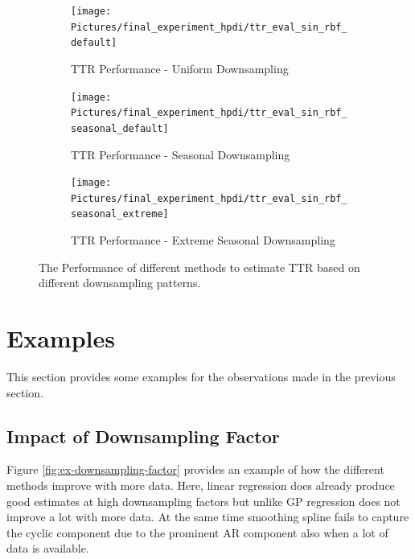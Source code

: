 \begin{figure}[!htb]
\centering
\begin{subfigure}{\textwidth}
    \centering
    \texttt{[image: Pictures/final\_experiment\_hpdi/ttr\_eval\_sin\_rbf\_default]}
    \caption{TTR Performance - Uniform Downsampling}
    \label{fig:ttr-uniform-sampling-performance}
\end{subfigure}

\bigskip

\begin{subfigure}{\textwidth}
    \centering
    \texttt{[image: Pictures/final\_experiment\_hpdi/ttr\_eval\_sin\_rbf\_seasonal\_default]}
    \caption{TTR Performance - Seasonal Downsampling}
    \label{fig:ttr-seasonal-sampling-performance}
\end{subfigure}

\bigskip

\begin{subfigure}{\textwidth}
    \centering
    \texttt{[image: Pictures/final\_experiment\_hpdi/ttr\_eval\_sin\_rbf\_seasonal\_extreme]}
    \caption{TTR Performance - Extreme Seasonal Downsampling}
    \label{fig:ttr-extreme-seasonal-sampling-performance}
\end{subfigure}

\caption[TTR Performance]{The Performance of different methods to
estimate TTR based on different downsampling patterns.
}
\label{fig:ttr-performance}
\end{figure}


\section{Examples}
This section provides some examples for the observations made in the previous section.

\subsection{Impact of Downsampling Factor}

Figure \ref{fig:ex-downsampling-factor} provides an example
of how the different methods improve with more data.
Here, linear regression
does already produce good estimates at high downsampling
factors but unlike GP regression does not improve a lot with more data.
At the same time smoothing spline fails to capture the cyclic component
due to the prominent AR component
also when a lot of data is available.

